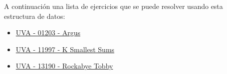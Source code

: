 A continuación una lista de ejercicios que se puede resolver usando esta estructura de datos:

\begin{itemize}
	\item \href{https://onlinejudge.org/index.php?option=com_onlinejudge&Itemid=8&category=247&page=show_problem&problem=3644}{UVA - 01203 - Argus}
	\item \href{https://onlinejudge.org/index.php?option=com_onlinejudge&Itemid=8&category=229&page=show_problem&problem=3148}{UVA - 11997 - K Smallest Sums}
	\item \href{https://onlinejudge.org/index.php?option=com_onlinejudge&Itemid=8&category=871&page=show_problem&problem=5101}{UVA - 13190 - Rockabye Tobby}
\end{itemize}